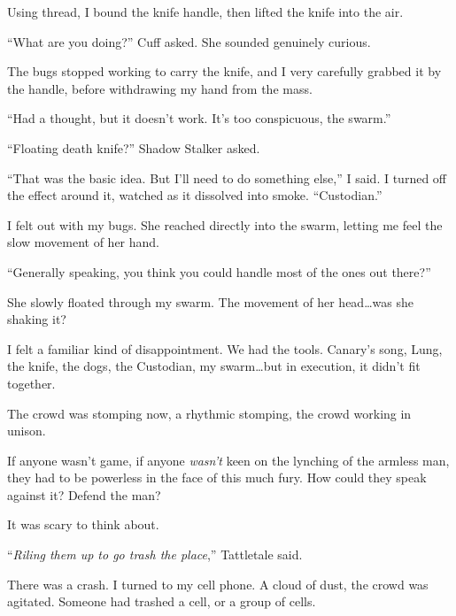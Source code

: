 Using thread, I bound the knife handle, then lifted the knife into the air.



``What are you doing?'' Cuff asked.  She sounded genuinely curious.



The bugs stopped working to carry the knife, and I very carefully grabbed it by the handle, before withdrawing my hand from the mass.



``Had a thought, but it doesn't work.  It's too conspicuous, the swarm.''



``Floating death knife?'' Shadow Stalker asked.



``That was the basic idea.  But I'll need to do something else,'' I said.  I turned off the effect around it, watched as it dissolved into smoke.  ``Custodian.''



I felt out with my bugs.  She reached directly into the swarm, letting me feel the slow movement of her hand.



``Generally speaking, you think you could handle most of the ones out there?''



She slowly floated through my swarm.  The movement of her head\ldots was she shaking it?



I felt a familiar kind of disappointment.  We had the tools.  Canary's song, Lung, the knife, the dogs, the Custodian, my swarm\ldots but in execution, it didn't fit together.



The crowd was stomping now, a rhythmic stomping, the crowd working in unison.



If anyone wasn't game, if anyone \emph{wasn't} keen on the lynching of the armless man, they had to be powerless in the face of this much fury.  How could they speak against it?  Defend the man?



It was scary to think about.



``\emph{Riling them up to go trash the place},'' Tattletale said.



There was a crash.  I turned to my cell phone.  A cloud of dust, the crowd was agitated.  Someone had trashed a cell, or a group of cells.



